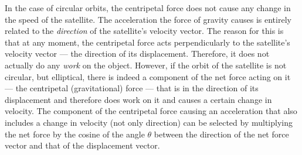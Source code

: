 \begin{figure}[h!]
	\centering
\end{figure}

In the case of circular orbits, the centripetal force does not cause any change in the speed of the satellite. The acceleration the force of gravity causes is entirely related to the \emph{direction} of the satellite's velocity vector. The reason for this is that at any moment, the centripetal force acts perpendicularly to the satellite's velocity vector --- the direction of its displacement. Therefore, it does not actually do any \emph{work} on the object. However, if the orbit of the satellite is not circular, but elliptical, there is indeed a component of the net force acting on it --- the centripetal (gravitational) force --- that is in the direction of its displacement and therefore does work on it and causes a certain change in velocity. The component of the centripetal force causing an acceleration that also includes a change in velocity (not only direction) can be selected by multiplying the net force by the cosine of the angle $\theta$ between the direction of the net force vector and that of the displacement vector.

